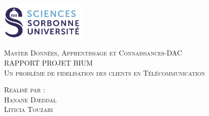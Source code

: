 \documentclass{article}
\begin{document}
\begin{titlepage}
    \begin{flushleft}
    \includegraphics[width=11em]{logo.png}\\[1.5cm]
    \end{flushleft}
    \begin{center}
        \textsc{{\LARGE \color{blue} Master Données, Apprentissage et Connaissances-DAC}}\\[5cm]
        \textsc{\LARGE{RAPPORT PROJET BIUM}}\\[1cm]
        \textsc{\vspace{10pt}\Huge{Un problème de fidelisation des clients en Télécommunication}}\\[4cm]
        \begin{minipage}{1\textwidth}
            \begin{flushleft} \large
            \textsc{\LARGE{Realisé par :}}\\[0.5cm]
            \textsc{Hanane Djeddal}\\
            \textsc{Liticia Touzari}\\[1.5 cm]
            \end{flushleft}
        \end{minipage}
        \vfill
    \end{center}
  \end{titlepage}
  

\tableofcontents					%


\newpage
\end{document}

